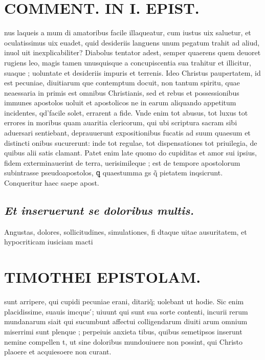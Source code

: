 \documentclass{article}
\begin{document}
\begin{pages}
\section*{COMMENT. IN I. EPIST. }
\marginpar{[ p.166 ]}\pstart nus laqueis a mum di amatoribus facile illaqueatur, cum iustus uix saluetur, et oculatissimus uix euadet, quid desideriis languens unum pegatum trahit ad aliud, inuol uit inexplicabiliter? Diabolus tentator adest, semper quaerens quem deuoret rugiens leo, magis tamen unusquisque a concupiscentia sua trahitur et illicitur, suaque ; uoluntate et desideriis impuris et terrenis. Ideo Christus paupertatem, id est pecuniae, diuitiarum que contemptum docuit, non tantum spiritu, quae neaessaria in primis est omnibus Christianis, sed et rebus et possessionibus immunes apostolos uoluit et apostolicos ne in earum aliquando appetitum incidentes, qd'facile solet, errarent a fide. Vnde enim tot abusus, tot luxus tot errores in moribus quam auaritia clericorum, qui ubi scriptura sacram sibi aduersari sentiebant, deprauuerunt expositionibus fucatis ad suum quaesum et distincti onibus sucurerunt: inde tot regulae, tot dispensationes tot priuilegia, de quibus alii satis clamant. Patet enim late quomo do cupiditas et amor sui ipsius, fidem exterminauerint de terra, uerisimileque ; est de tempore apostolorum subintrasse pseudoapostolos, ꝗ quaestumma gs q̃ pietatem inqsicrunt. Conqueritur haec saepe apost.  \pend
{}
{}
\subsection*{\textit{Et inseruerunt se doloribus multis. }}\pstart Angustas, dolores, sollicitudines, simulationes, fi dtaque uitae ausuritatem, et hypocriticam iusiciam macti  \pend
\section*{TIMOTHEI EPISTOLAM. }
\marginpar{[ p.167 ]}\pstart sunt arripere, qui cupidi pecuniae erani, ditariq̃; uolebant ut hodie. Sic enim placidissime, suauis imcque ́; uiuunt qui sunt sua sorte contenti, incurii rerum mundanarum siait qui sucumbunt affectui colligendarum diuiti arum omnium miserrimi sunt plenque ; perpeiuis anxieta tibus, quibus semetipsos inserunt nemine compellen t, ut sine doloribus mundouiuere non possint, qui Christo plaoere et acquiesoere non curant.  \pend
{}
{}

\end{pages}
\end{document}
